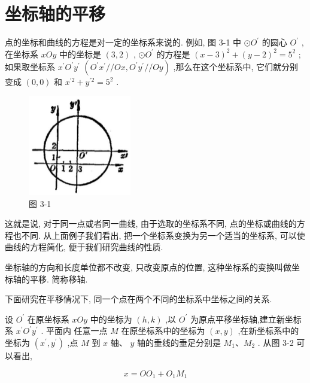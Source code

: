 \documentclass[lang=cn,newtx,12pt,scheme=chinese]{elegantbook}
\begin{document}
\section{坐标轴的平移}

点的坐标和曲线的方程是对一定的坐标系来说的. 例如, 图 3-1 中 \(\odot {O}^{\prime }\) 的圆心 \({O}^{\prime }\) ,在坐标系 \({xOy}\) 中的坐标是 \(\left( {3,2}\right)\) , \(\odot {O}^{\prime }\) 的方程是 \({\left( x - 3\right) }^{2} + {\left( y - 2\right) }^{2} = {5}^{2}\) ; 如果取坐标系 \({x}^{\prime }{O}^{\prime }{y}^{\prime }\) \(\left( {{O}^{\prime }{x}^{\prime }//{Ox},{O}^{\prime }{y}^{\prime }//{Oy}}\right)\) ,那么在这个坐标系中, 它们就分别变成 \(\left( {0,0}\right)\) 和 \({x}^{\prime 2} + {y}^{\prime 2} = {5}^{2}\) .

\begin{figure}[h]
  \centering
  \includegraphics[max width=0.4\textwidth]{images/01912cc2-ffb6-728e-9ae7-b113ff05c64b_133_858738.jpg}
  \caption{图 3-1}
\end{figure}

这就是说, 对于同一点或者同一曲线, 由于选取的坐标系不同, 点的坐标或曲线的方程也不同. 从上面例子我们看出, 把一个坐标系变换为另一个适当的坐标系, 可以使曲线的方程简化, 便于我们研究曲线的性质.
\begin{definition}[平移变换] 
坐标轴的方向和长度单位都不改变, 只改变原点的位置, 这种坐标系的变换叫做坐标轴的平移. 简称移轴.
\end{definition}
下面研究在平移情况下, 同一个点在两个不同的坐标系中坐标之间的关系.

设 \({O}^{\prime }\) 在原坐标系 \({xOy}\) 中的坐标为 \(\left( {h,k}\right)\) ,以 \({O}^{\prime }\) 为原点平移坐标轴,建立新坐标系 \({x}^{\prime }{O}^{\prime }{y}^{\prime }\) . 平面内 任意一点 \(M\) 在原坐标系中的坐标为 \(\left( {x,y}\right)\) ,在新坐标系中的坐标为 \(\left( {{x}^{\prime },{y}^{\prime }}\right)\) ,点 \(M\) 到 \(x\) 轴、 \(y\) 轴的垂线的垂足分别是 \({M}_{1}\text{、}{M}_{2}\) . 从图 3-2 可以看出,

\[
  x = O{O}_{1} + {O}_{1}{M}_{1}
\]
\end{document}
